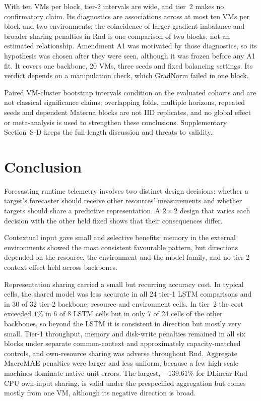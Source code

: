 \documentclass[5p,twocolumn]{elsarticle}
\begin{document}
With ten VMs per block, tier-2 intervals are wide, and tier~2 makes no
confirmatory claim. Its diagnostics are associations across at most ten VMs
per block and two environments; the coincidence of larger gradient
imbalance and broader sharing penalties in Rnd is one comparison of two
blocks, not an estimated relationship. Amendment A1 was motivated by those
diagnostics, so its hypothesis was chosen after they were seen, although it
was frozen before any A1 fit. It covers one backbone, 20 VMs, three seeds
and fixed balancing settings. Its verdict depends on a manipulation check,
which GradNorm failed in one block.

Paired VM-cluster bootstrap intervals condition on the evaluated cohorts and
are not classical significance claims; overlapping folds, multiple horizons,
repeated seeds and dependent Materna blocks are not IID replicates, and no
global effect or meta-analysis is used to strengthen these conclusions.
Supplementary Section~S-D keeps the full-length discussion and threats to
validity.

\section{Conclusion}
\label{sec:conclusion}

Forecasting runtime telemetry involves two distinct design decisions: whether
a target's forecaster should receive other resources' measurements and
whether targets should share a predictive representation. A $2\times2$
design that varies each decision with the other held fixed shows that their
consequences differ.

Contextual input gave small and selective benefits: memory in the external
environments showed the most consistent favourable pattern, but directions
depended on the resource, the environment and the model family, and no
tier-2 context effect held across backbones.

Representation sharing carried a small but recurring accuracy cost. In
typical cells, the shared model was less accurate in all 24 tier-1 LSTM
comparisons and in 30 of 32 tier-2 backbone, resource and environment cells.
In tier~2 the cost exceeded $1\%$ in 6 of 8 LSTM cells but in only 7 of 24
cells of the other backbones, so beyond the LSTM it is consistent in
direction but mostly very small. Tier-1 throughput, memory
and disk-write penalties remained in all six blocks under separate
common-context and approximately capacity-matched controls, and own-resource
sharing was adverse throughout Rnd. Aggregate MacroMAE penalties were larger
and less uniform, because a few high-scale machines dominate native-unit
errors. The largest, $-139.61\%$ for DLinear Rnd CPU own-input sharing, is
valid under the prespecified aggregation but comes mostly from one VM, although its
negative direction is broad.
\end{document}
